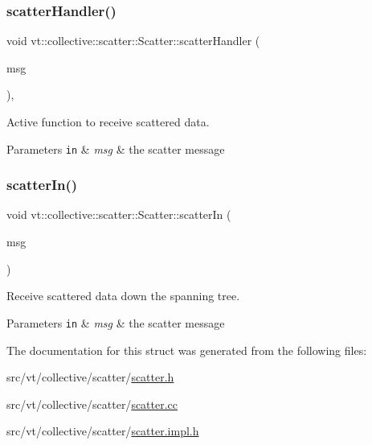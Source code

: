 \subsubsection{\texorpdfstring{scatter\+Handler()}{scatterHandler()}}
{\footnotesize\ttfamily void vt\+::collective\+::scatter\+::\+Scatter\+::scatter\+Handler (\begin{DoxyParamCaption}\item[{\hyperlink{structvt_1_1collective_1_1scatter_1_1_scatter_msg}{Scatter\+Msg} $\ast$}]{msg }\end{DoxyParamCaption})\hspace{0.3cm}{\ttfamily [static]}, {\ttfamily [private]}}



Active function to receive scattered data. 


\begin{DoxyParams}[1]{Parameters}
\mbox{\tt in}  & {\em msg} & the scatter message \\
\hline
\end{DoxyParams}
\mbox{\label{structvt_1_1collective_1_1scatter_1_1_scatter_aa80a957377cce3126058f3d7d30d2fed}} 
\subsubsection{\texorpdfstring{scatter\+In()}{scatterIn()}}
{\footnotesize\ttfamily void vt\+::collective\+::scatter\+::\+Scatter\+::scatter\+In (\begin{DoxyParamCaption}\item[{\hyperlink{structvt_1_1collective_1_1scatter_1_1_scatter_msg}{Scatter\+Msg} $\ast$}]{msg }\end{DoxyParamCaption})\hspace{0.3cm}{\ttfamily [protected]}}



Receive scattered data down the spanning tree. 


\begin{DoxyParams}[1]{Parameters}
\mbox{\tt in}  & {\em msg} & the scatter message \\
\hline
\end{DoxyParams}


The documentation for this struct was generated from the following files\+:\begin{DoxyCompactItemize}
\item 
src/vt/collective/scatter/\hyperlink{scatter_8h}{scatter.\+h}\item 
src/vt/collective/scatter/\hyperlink{scatter_8cc}{scatter.\+cc}\item 
src/vt/collective/scatter/\hyperlink{scatter_8impl_8h}{scatter.\+impl.\+h}\end{DoxyCompactItemize}
